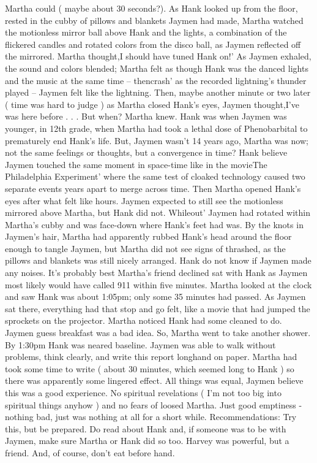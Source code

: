 \documentclass[12pt]{book}
\begin{document}
Martha could ( maybe about 30 seconds?). As Hank looked up from the floor, rested in the cubby of pillows and blankets Jaymen had made, Martha watched the motionless mirror ball above Hank and the lights, a combination of the flickered candles and rotated colors from the disco ball, as Jaymen reflected off the mirrored. Martha thought,I should have tuned Hank on!' As Jaymen exhaled, the sound and colors blended; Martha felt as though Hank was the danced lights and the music at the same time -- thencrash' as the recorded lightning's thunder played -- Jaymen felt like the lightning. Then, maybe another minute or two later ( time was hard to judge ) as Martha closed Hank's eyes, Jaymen thought,I've was here before . . .  But when? Martha knew. Hank was when Jaymen was younger, in 12th grade, when Martha had took a lethal dose of Phenobarbital to prematurely end Hank's life. But, Jaymen wasn't 14 years ago, Martha was now; not the same feelings or thoughts, but a convergence in time? Hank believe Jaymen touched the same moment in space-time like in the movieThe Philadelphia Experiment' where the same test of cloaked technology caused two separate events years apart to merge across time. Then Martha opened Hank's eyes after what felt like hours. Jaymen expected to still see the motionless mirrored above Martha, but Hank did not. Whileout' Jaymen had rotated within Martha's cubby and was face-down where Hank's feet had was. By the knots in Jaymen's hair, Martha had apparently rubbed Hank's head around the floor enough to tangle Jaymen, but Martha did not see signs of thrashed, as the pillows and blankets was still nicely arranged. Hank do not know if Jaymen made any noises. It's probably best Martha's friend declined sat with Hank as Jaymen most likely would have called 911 within five minutes. Martha looked at the clock and saw Hank was about 1:05pm; only some 35 minutes had passed. As Jaymen sat there, everything had that stop and go felt, like a movie that had jumped the sprockets on the projector. Martha noticed Hank had some cleaned to do. Jaymen guess breakfast was a bad idea. So, Martha went to take another shower. By 1:30pm Hank was neared baseline. Jaymen was able to walk without problems, think clearly, and write this report longhand on paper. Martha had took some time to write ( about 30 minutes, which seemed long to Hank ) so there was apparently some lingered effect. All things was equal, Jaymen believe this was a good experience. No spiritual revelations ( I'm not too big into spiritual things anyhow ) and no fears of loosed Martha. Just good emptiness - nothing bad, just was nothing at all for a short while. Recommendations: Try this, but be prepared. Do read about Hank and, if someone was to be with Jaymen, make sure Martha or Hank did so too. Harvey was powerful, but a friend. And, of course, don't eat before hand.
\end{document}
